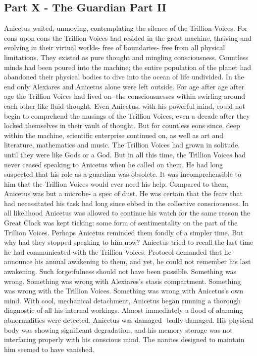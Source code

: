 \documentclass[a4paper]{article}
\begin{document}
\subsection{Part X - The Guardian Part II}
Anicetus waited, unmoving, contemplating the silence of the Trillion Voices. For eons upon eons the Trillion Voices had resided in the great machine, thriving and evolving in their virtual worlds- free of boundaries- free from all physical limitations. They existed as pure thought and mingling consciousness.
Countless minds had been poured into the machine; the entire population of the planet had abandoned their physical bodies to dive into the ocean of life undivided. In the end only Alexiares and Anicetus alone were left outside.
For age after age after age the Trillion Voices had lived on- the consciousnesses within swirling around each other like fluid thought. Even Anicetus, with his powerful mind, could not begin to comprehend the musings of the Trillion Voices, even a decade after they locked themselves in their vault of thought. But for countless eons since, deep within the machine, scientific enterprise continued on, as well as art and literature, mathematics and music. The Trillion Voices had grown in solitude, until they were like Gods or a God. But in all this time, the Trillion Voices had never ceased speaking to Anicetus when he called on them.
He had long suspected that his role as a guardian was obsolete. It was incomprehensible to him that the Trillion Voices would ever need his help. Compared to them, Anicetus was but a microbe- a spec of dust. He was certain that the fears that had necessitated his task had long since ebbed in the collective consciousness. In all likelihood Anicetus was allowed to continue his watch for the same reason the Great Clock was kept ticking: some form of sentimentality on the part of the Trillion Voices. Perhaps Anicetus reminded them fondly of a simpler time.
But why had they stopped speaking to him now? Anicetus tried to recall the last time he had communicated with the Trillion Voices. Protocol demanded that he announce his annual awakening to them, and yet, he could not remember his last awakening. Such forgetfulness should not have been possible.
Something was wrong. Something was wrong with Alexiares’s stasis compartment. Something was wrong with the Trillion Voices. Something was wrong with Anicetus’s own mind.
With cool, mechanical detachment, Anicetus began running a thorough diagnostic of all his internal workings. Almost immediately a flood of alarming abnormalities were detected. Anicetus was damaged- badly damaged. His physical body was showing significant degradation, and his memory storage was not interfacing properly with his conscious mind. The nanites designed to maintain him seemed to have vanished.
\end{document}
